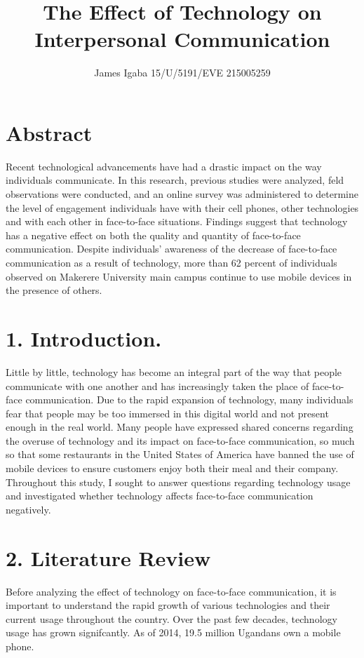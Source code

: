 \documentclass[11pt]{article} %
\title{The Effect of Technology on Interpersonal Communication}
\author{James Igaba 15/U/5191/EVE 215005259}
\begin{document}
\maketitle

\section{Abstract }

Recent technological advancements have had a drastic impact on the way individuals communicate. In this research, previous studies were analyzed, feld observations were conducted, and an online survey was administered to determine the level of engagement individuals have with their cell phones, other technologies and with each other in face-to-face situations. Findings suggest that technology has a negative effect on both the quality and quantity of face-to-face communication. Despite individuals’ awareness of the decrease of face-to-face communication as a result of technology, more than 62 percent of individuals observed on Makerere University main campus continue to use mobile devices in the presence of others. 

\section{1. Introduction.}

Little by little, technology has become an integral part of the way that people communicate with one another and has increasingly taken the place of face-to-face communication. Due to the rapid expansion of technology, many individuals fear that people may be too immersed in this digital world and not present enough in the real world.
Many people have expressed shared concerns regarding the overuse of technology and its impact on face-to-face communication, so much so that some restaurants in the United States of America have banned the use of mobile devices to ensure customers enjoy both their meal and their company.
Throughout this study, I sought to answer questions regarding technology usage and investigated whether technology affects face-to-face communication negatively. 

\section{2. Literature Review}

Before analyzing the effect of technology on face-to-face communication, it is important to understand the rapid growth of various technologies and their current usage throughout the country. Over the past few decades, technology usage has grown signifcantly. As of 2014, 19.5 million Ugandans own a mobile phone.
\end{document}
